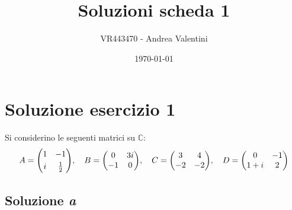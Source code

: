 \documentclass[a4paper]{article}
\makeatletter
\newenvironment{rowequmat}[1]{\left(\array{@{}#1@{}}}{\endarray\right)}
\makeatother
\begin{document}
	\author{VR443470 - Andrea Valentini}
	\title{Soluzioni scheda 1}
	\date{\printdayoff\today}
	\maketitle
	
	\newpage
	
	\tableofcontents
	
	\newpage
	
	\section{Soluzione esercizio 1}
	
	Si considerino le seguenti matrici su $\mathbb{C}$:
	\begin{equation*}
		A = \begin{rowequmat}{cc}
			1 & -1 \\ [0.3em]
			i & \frac{1}{2}
		\end{rowequmat}, \hspace{1em}
		B = \begin{rowequmat}{cc}
			0 & 3i \\
			-1 & 0
		\end{rowequmat}, \hspace{1em}
		C = \begin{rowequmat}{cc}
			3 & 4 \\
			-2 & -2
		\end{rowequmat}, \hspace{1em}
		D = \begin{rowequmat}{cc}
			0 & -1 \\
			1+i & 2
		\end{rowequmat}
	\end{equation*}
	
	\subsection{Soluzione \emph{a}}
	
\end{document}
